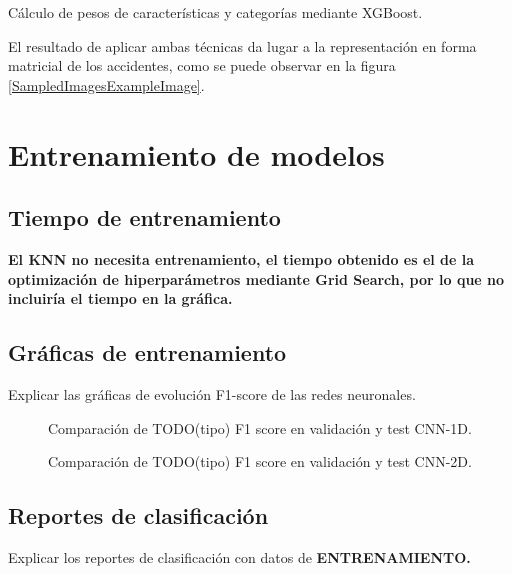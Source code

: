\begin{table}[H]
          \caption{Cálculo de pesos de características y categorías mediante XGBoost.}
          \label{PesosFinalesCaracteristicas}
        \end{table}


        El resultado de aplicar ambas técnicas da lugar a la representación en forma matricial de los accidentes, como se puede observar en la figura \ref{SampledImagesExampleImage}.

\section{Entrenamiento de modelos}

  \subsection{Tiempo de entrenamiento}

  \textbf{El KNN no necesita entrenamiento, el tiempo obtenido es el de la optimización de hiperparámetros mediante Grid Search, por lo que no incluiría el tiempo en la gráfica.}

  \subsection{Gráficas de entrenamiento}

    Explicar las gráficas de evolución F1-score de las redes neuronales.


    \begin{figure}[h]
        \centering
        
        \caption{Comparación de TODO(tipo) F1 score en validación y test CNN-1D.}
        \label{F1Score1DImage}
     \end{figure}


    \begin{figure}[h]
        \centering
        
        \caption{Comparación de TODO(tipo) F1 score en validación y test CNN-2D.}
        \label{F1Score2DImage}
     \end{figure}


  \subsection{Reportes de clasificación}
       
    Explicar los reportes de clasificación con datos de \textbf{ENTRENAMIENTO.}

